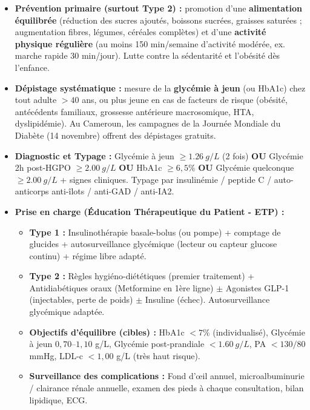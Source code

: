 \documentclass[11pt]{article}
\begin{document}
\begin{itemize}
\item \textbf{Prévention primaire (surtout Type 2) :} promotion d'une \textbf{alimentation équilibrée} (réduction des sucres ajoutés, boissons sucrées, graisses saturées ; augmentation fibres, légumes, céréales complètes) et d'une \textbf{activité physique régulière} (au moins 150 min/semaine d'activité modérée, ex. marche rapide 30 min/jour). Lutte contre la sédentarité et l'obésité dès l'enfance.
\item \textbf{Dépistage systématique :} mesure de la \textbf{glycémie à jeun} (ou HbA1c) chez tout adulte $> 40$ ans, ou plus jeune en cas de facteurs de risque (obésité, antécédents familiaux, grossesse antérieure macrosomique, HTA, dyslipidémie). Au Cameroun, les campagnes de la Journée Mondiale du Diabète (14 novembre) offrent des dépistages gratuits.
\item \textbf{Diagnostic et Typage :} Glycémie à jeun $\geq \SI{1,26}{g/L}$ (2 fois) \textbf{OU} Glycémie 2h post-HGPO $\geq \SI{2,00}{g/L}$ \textbf{OU} HbA1c $\geq 6,5\%$ \textbf{OU} Glycémie quelconque $\geq \SI{2,00}{g/L}$ + signes cliniques. Typage par insulinémie / peptide C / auto-anticorps anti-îlots / anti-GAD / anti-IA2.
\item \textbf{Prise en charge (Éducation Thérapeutique du Patient - ETP) :}
      \begin{itemize}
      \item \textbf{Type 1 :} Insulinothérapie basale-bolus (ou pompe) + comptage de glucides + autosurveillance glycémique (lecteur ou capteur glucose continu) + régime libre adapté.
      \item \textbf{Type 2 :} Règles hygiéno-diététiques (premier traitement) + Antidiabétiques oraux (Metformine en 1ère ligne) $\pm$ Agonistes GLP-1 (injectables, perte de poids) $\pm$ Insuline (échec). Autosurveillance glycémique adaptée.
      \item \textbf{Objectifs d'équilibre (cibles) :} HbA1c $< 7\%$ (individualisé), Glycémie à jeun $0,70$--$1,10$ g/L, Glycémie post-prandiale $< \SI{1,60}{g/L}$, PA $< 130/80$ mmHg, LDL-c $< 1,00$ g/L (très haut risque).
      \item \textbf{Surveillance des complications :} Fond d'œil annuel, microalbuminurie / clairance rénale annuelle, examen des pieds à chaque consultation, bilan lipidique, ECG.
      \end{itemize}
\end{itemize}
\end{document}
